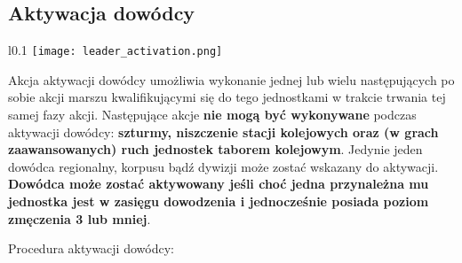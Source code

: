 

\subsection{Aktywacja dowódcy}
\begin{wrapfigure}{l}{0.1\textwidth}
  \texttt{[image: leader\_activation.png]}
\end{wrapfigure}
Akcja aktywacji dowódcy umożliwia wykonanie jednej lub wielu następujących po sobie akcji marszu kwalifikującymi się do tego jednostkami w trakcie trwania tej samej fazy akcji. Następujące akcje \textbf{nie mogą być wykonywane} podczas aktywacji dowódcy: \textbf{szturmy, niszczenie stacji kolejowych oraz (w grach zaawansowanych) ruch jednostek taborem kolejowym}. Jedynie jeden dowódca regionalny, korpusu bądź dywizji może zostać wskazany do aktywacji. \textbf{Dowódca może zostać aktywowany jeśli choć jedna przynależna mu jednostka jest w zasięgu dowodzenia i jednocześnie posiada poziom zmęczenia 3 lub mniej}.\par
Procedura aktywacji dowódcy:
